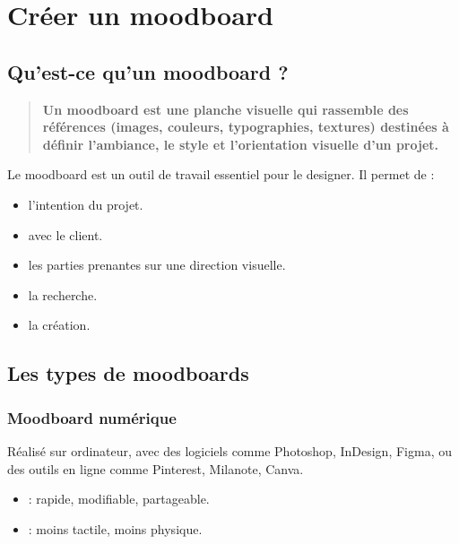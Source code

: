 \section{Créer un moodboard}

\subsection{Qu'est-ce qu'un moodboard ?}

\begin{quote}
\textbf{Un moodboard est une planche visuelle qui rassemble des références (images, couleurs, typographies, textures) destinées à définir l'ambiance, le style et l'orientation visuelle d'un projet.}
\end{quote}

Le moodboard est un outil de travail essentiel pour le designer. Il permet de :

\begin{itemize}
    \item {} l'intention du projet.
    \item {} avec le client.
    \item {} les parties prenantes sur une direction visuelle.
    \item {} la recherche.
    \item {} la création.
\end{itemize}

\subsection{Les types de moodboards}

\subsubsection{Moodboard numérique}

Réalisé sur ordinateur, avec des logiciels comme Photoshop, InDesign, Figma, ou des outils en ligne comme Pinterest, Milanote, Canva.

\begin{itemize}
    \item {} : rapide, modifiable, partageable.
    \item {} : moins tactile, moins physique.
\end{itemize}

